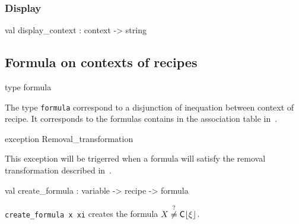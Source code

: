 \subsubsection{Display}




\label{val:Recipe.display-underscorecontext}\begin{ocamldoccode}
val display_context : context -> string
\end{ocamldoccode}




\subsection{Formula on contexts of recipes}




\label{type:Recipe.formula}\begin{ocamldoccode}
type formula 
\end{ocamldoccode}
\begin{ocamldocdescription}
The type {\tt{formula}} correspond to a disjunction of inequation between context of recipe.
    It corresponds to the formulas contains in the association table in~. 


\end{ocamldocdescription}




\label{exception:Recipe.Removal-underscoretransformation}\begin{ocamldoccode}
exception Removal_transformation
\end{ocamldoccode}
\begin{ocamldocdescription}
This exception will be trigerred when a formula will satisfy the removal transformation
    described in~. 


\end{ocamldocdescription}




\label{val:Recipe.create-underscoreformula}\begin{ocamldoccode}
val create_formula : variable -> recipe -> formula
\end{ocamldoccode}
\begin{ocamldocdescription}
{\tt{create\_formula x xi}} creates the formula $X \stackrel{?}{\neq} {\mathsf{C}\lfloor\xi\rfloor_{}}$. 


\end{ocamldocdescription}




